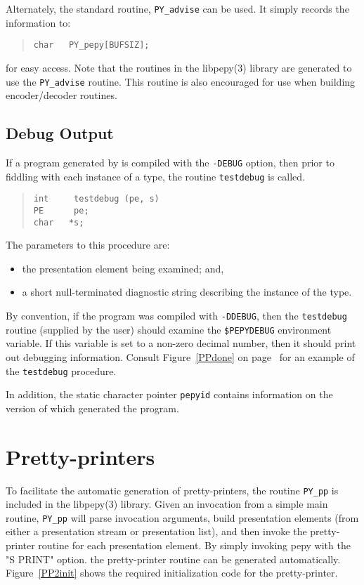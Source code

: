 Alternately,
the standard routine, \verb"PY_advise" can be used.
It simply records the information to:
\begin{quote}\small\begin{verbatim}
char   PY_pepy[BUFSIZ];
\end{verbatim}\end{quote}
for easy access.
Note that the routines in the \man libpepy(3) library are generated to use
the \verb"PY_advise" routine. This routine is also encouraged for use
when building  encoder/decoder routines.

\subsection	{Debug Output}
If a program generated by  is compiled with the \verb"-DEBUG" option,
then prior to fiddling with each instance of a type,
the routine \verb"testdebug" is called.
\begin{quote}\small\begin{verbatim}
int     testdebug (pe, s)
PE      pe;
char   *s;
\end{verbatim}\end{quote}
The parameters to this procedure are:
\begin{itemize}
\item	the presentation element being examined; and,

\item	a short null-terminated diagnostic string describing the instance
	of the type.
\end{itemize}

By convention,
if the program was compiled with \verb"-DDEBUG",
then the \verb"testdebug" routine (supplied by the user)
should examine the \verb"$PEPYDEBUG" environment variable.
If this variable is set to a non-zero decimal number,
then it should print out debugging information.
Consult Figure~\ref{PPdone} on page~\pageref{PPdone} for an example of the
\verb"testdebug" procedure.

In addition,
the static character pointer \verb"pepyid" contains
information on the version of  which generated the program.

\section	{Pretty-printers}\label{pepy:pretty}
To facilitate the automatic generation of pretty-printers,
the routine \verb"PY_pp" is included in the \man libpepy(3) library.
Given an invocation from a simple main routine,
\verb"PY_pp" will parse invocation arguments,
build presentation elements
(from either a presentation stream or presentation list),
and then invoke the pretty-printer routine for each presentation element.
By simply invoking pepy with the \switch"S PRINT" option.
the pretty-printer routine can be generated automatically.
Figure~\ref{PP2init} shows the required initialization code for the
pretty-printer.


